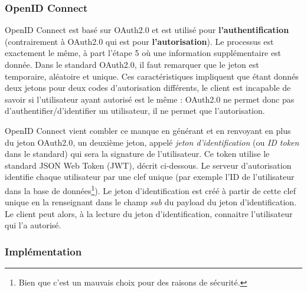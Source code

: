 \subsubsection*{OpenID Connect}

OpenID Connect est basé sur OAuth2.0 et est utilisé pour
\textbf{l'authentification} (contrairement à OAuth2.0 qui est pour
\textbf{l'autorisation}). Le processus est exactement le même, à part l'étape 5
où une information supplémentaire est donnée.
Dans le standard OAuth2.0, il faut remarquer que le jeton est temporaire, aléatoire et
unique. Ces caractéristiques impliquent que étant donnés deux jetons pour deux
codes d'autorisation différents, le client est
incapable de savoir si l'utilisateur ayant autorisé est le même : OAuth2.0
ne permet donc pas d'authentifier/d'identifier un utilisateur, il ne permet que l'autorisation.

OpenID Connect vient combler ce manque en générant et en renvoyant en plus du
jeton OAuth2.0, un deuxième jeton, appelé
\emph{jeton d'identification} (ou \emph{ID token} dans le standard) qui sera la
signature de l'utilisateur. Ce token utilise le standard JSON Web Token (JWT),
décrit ci-dessous. Le serveur d'autorisation identifie chaque utilisateur par
une clef unique (par exemple l'ID de l'utilisateur dans la base de données\footnote{Bien que c'est un mauvais choix pour
  des raisons de sécurité.}). Le jeton d'identification est créé à partir de
cette clef unique en la renseignant dans le champ \emph{sub} du payload du jeton
d'identification.
Le client peut alors, à la lecture du jeton d'identification, connaitre
l'utilisateur qui l'a autorisé.


\subsubsection*{Implémentation}


